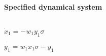
\(\)
\paragraph{Specified dynamical system}
\(
\)\par

\(\dot x_{1}=-w_{1} y_{1} \sigma 
\)\par

\(\dot y_{1}=w_{1} x_{1} \sigma -y_{1}
\)\par
